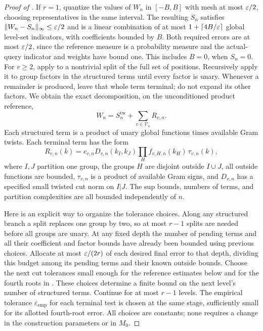 \begin{proof}[Proof of ]
If $r=1$, quantize the values of $W_n$ in $[-B,B]$ with mesh at most
$\varepsilon/2$, choosing representatives in the same interval. The resulting
$S_n$ satisfies $\lVert W_n-S_n\rVert_\infty\le\varepsilon/2$ and is a linear
combination of at most $1+\lceil4B/\varepsilon\rceil$ global level-set
indicators, with coefficients bounded by $B$. Both required errors
are at most $\varepsilon/2$, since the reference measure is a probability
measure and the actual-query indicator and weights have bound one.
This includes $B=0$, when $S_n=0$. For $r\ge2$,
apply  to a nontrivial split of
the full set of positions. Recursively apply it to group factors in
the structured terms until every factor is unary. Whenever a
remainder is produced, leave that whole term terminal; do not expand
its other factors. We obtain the exact decomposition, on the
unconditioned product reference,
\begin{equation}\label{eq:product-recursive-decomposition}
 W_n=S_n^{\mathrm{tw}}+\sum_{v\in\mathcal V_n}R_{v,n}.
\end{equation}
Each structured term is a product of unary global functions times
available Gram twists. Each terminal term has the form
\begin{equation}\label{eq:product-terminal-form}
 R_{v,n}(k)=c_{v,n}D_{v,n}(k_I,k_J)
       \prod_{H}f_{v,H,n}(k_H)\,\tau_{v,n}(k),
\end{equation}
where $I,J$ partition one group, the groups $H$ are disjoint outside
$I\cup J$, all outside functions are bounded, $\tau_{v,n}$ is a
product of available Gram signs, and $D_{v,n}$ has a specified small
twisted cut norm on $I|J$. The sup bounds, numbers of terms, and
partition complexities are all bounded independently of $n$.

Here is an explicit way to organize the tolerance choices. Along
any structured branch a split replaces one group by two, so at most
$r-1$ splits are needed before all groups are unary. At any fixed
depth the number of pending terms and all their coefficient and
factor bounds have already been bounded using previous choices.
Allocate at most $\varepsilon/(2r)$ of each desired final error to that
depth, dividing this budget among its pending terms and their known
outside bounds. Choose the next cut tolerances small enough for the
reference estimates below and for the fourth roots in
. These choices determine a
finite bound on the next level's number of structured terms.
Continue for at most $r-1$ levels. The empirical tolerance $\varepsilon_{\mathrm{emp}}$ for
each terminal test is chosen at the same stage, sufficiently small
for its allotted fourth-root error. All choices are constants; none
requires a change in the construction parameters or in $M_0$.


\end{proof}
